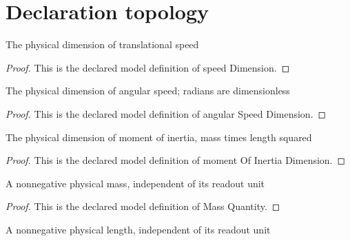 \section{Declaration topology}
\begin{definition}
  \label{def:physics:phyx-mini-0335:phyxminiproblems-problemphyxmini0335-speeddimension}
  The physical dimension of translational speed
\end{definition}
\begin{proof}
  This is the declared model definition of speed Dimension.
\end{proof}
\begin{definition}
  \label{def:physics:phyx-mini-0335:phyxminiproblems-problemphyxmini0335-angularspeeddimension}
  The physical dimension of angular speed; radians are dimensionless
\end{definition}
\begin{proof}
  This is the declared model definition of angular Speed Dimension.
\end{proof}
\begin{definition}
  \label{def:physics:phyx-mini-0335:phyxminiproblems-problemphyxmini0335-momentofinertiadimension}
  The physical dimension of moment of inertia, mass times length squared
\end{definition}
\begin{proof}
  This is the declared model definition of moment Of Inertia Dimension.
\end{proof}
\begin{definition}
  \label{def:physics:phyx-mini-0335:phyxminiproblems-problemphyxmini0335-massquantity}
  A nonnegative physical mass, independent of its readout unit
\end{definition}
\begin{proof}
  This is the declared model definition of Mass Quantity.
\end{proof}
\begin{definition}
  \label{def:physics:phyx-mini-0335:phyxminiproblems-problemphyxmini0335-lengthquantity}
  A nonnegative physical length, independent of its readout unit
\end{definition}
